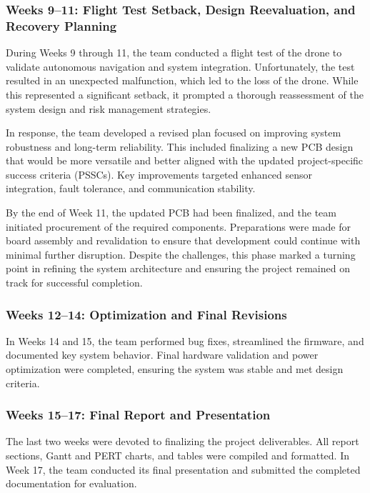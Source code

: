 \documentclass[12pt]{article}
\begin{document}
\subsubsection*{Weeks 9–11: Flight Test Setback, Design Reevaluation, and Recovery Planning}

During Weeks 9 through 11, the team conducted a flight test of the drone to validate autonomous navigation and system integration. Unfortunately, the test resulted in an unexpected malfunction, which led to the loss of the drone. While this represented a significant setback, it prompted a thorough reassessment of the system design and risk management strategies.

In response, the team developed a revised plan focused on improving system robustness and long-term reliability. This included finalizing a new PCB design that would be more versatile and better aligned with the updated project-specific success criteria (PSSCs). Key improvements targeted enhanced sensor integration, fault tolerance, and communication stability.

By the end of Week 11, the updated PCB had been finalized, and the team initiated procurement of the required components. Preparations were made for board assembly and revalidation to ensure that development could continue with minimal further disruption. Despite the challenges, this phase marked a turning point in refining the system architecture and ensuring the project remained on track for successful completion.

\subsubsection*{Weeks 12–14: Optimization and Final Revisions}
In Weeks 14 and 15, the team performed bug fixes, streamlined the firmware, and documented key system behavior. Final hardware validation and power optimization were completed, ensuring the system was stable and met design criteria.

\subsubsection*{Weeks 15–17: Final Report and Presentation}
The last two weeks were devoted to finalizing the project deliverables. All report sections, Gantt and PERT charts, and tables were compiled and formatted. In Week 17, the team conducted its final presentation and submitted the completed documentation for evaluation.

\end{document}
